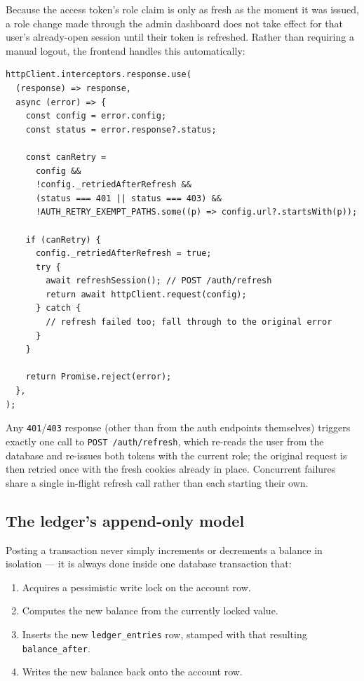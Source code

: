 \documentclass[11pt]{article}
\begin{document}
Because the access token's role claim is only as fresh as the moment it
was issued, a role change made through the admin dashboard does not take
effect for that user's already-open session until their token is
refreshed. Rather than requiring a manual logout, the frontend handles
this automatically:

\begin{lstlisting}[caption={Automatic refresh-and-retry, from \texttt{lib/api-client.ts}}]
httpClient.interceptors.response.use(
  (response) => response,
  async (error) => {
    const config = error.config;
    const status = error.response?.status;

    const canRetry =
      config &&
      !config._retriedAfterRefresh &&
      (status === 401 || status === 403) &&
      !AUTH_RETRY_EXEMPT_PATHS.some((p) => config.url?.startsWith(p));

    if (canRetry) {
      config._retriedAfterRefresh = true;
      try {
        await refreshSession(); // POST /auth/refresh
        return await httpClient.request(config);
      } catch {
        // refresh failed too; fall through to the original error
      }
    }

    return Promise.reject(error);
  },
);
\end{lstlisting}

Any \texttt{401}/\texttt{403} response (other than from the auth
endpoints themselves) triggers exactly one call to
\texttt{POST /auth/refresh}, which re-reads the user from the database
and re-issues both tokens with the current role; the original request is
then retried once with the fresh cookies already in place. Concurrent
failures share a single in-flight refresh call rather than each starting
their own.

\subsection{The ledger's append-only model}

Posting a transaction never simply increments or decrements a balance in
isolation --- it is always done inside one database transaction that:

\begin{enumerate}[nosep]
    \item Acquires a pessimistic write lock on the account row.
    \item Computes the new balance from the currently locked value.
    \item Inserts the new \texttt{ledger\_entries} row, stamped with that
    resulting \texttt{balance\_after}.
    \item Writes the new balance back onto the account row.
\end{enumerate}
\end{document}
